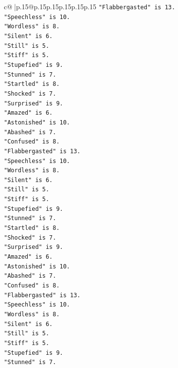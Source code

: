 \documentclass{article}
\begin{document}
{\begin{supertabular}{c@{$\;$}|p{.15\linewidth}@{}p{.15\linewidth}p{.15\linewidth}p{.15\linewidth}p{.15\linewidth}p{.15\linewidth}}
{{{\texttt{"Flabbergasted" is 13.} \\
\texttt{"Speechless" is 10.} \\
\texttt{"Wordless" is 8.} \\
\texttt{"Silent" is 6.} \\
\texttt{"Still" is 5.} \\
\texttt{"Stiff" is 5.} \\
\texttt{"Stupefied" is 9.} \\
\texttt{"Stunned" is 7.} \\
\texttt{"Startled" is 8.} \\
\texttt{"Shocked" is 7.} \\
\texttt{"Surprised" is 9.} \\
\texttt{"Amazed" is 6.} \\
\texttt{"Astonished" is 10.} \\
\texttt{"Abashed" is 7.} \\
\texttt{"Confused" is 8.} \\
\texttt{"Flabbergasted" is 13.} \\
\texttt{"Speechless" is 10.} \\
\texttt{"Wordless" is 8.} \\
\texttt{"Silent" is 6.} \\
\texttt{"Still" is 5.} \\
\texttt{"Stiff" is 5.} \\
\texttt{"Stupefied" is 9.} \\
\texttt{"Stunned" is 7.} \\
\texttt{"Startled" is 8.} \\
\texttt{"Shocked" is 7.} \\
\texttt{"Surprised" is 9.} \\
\texttt{"Amazed" is 6.} \\
\texttt{"Astonished" is 10.} \\
\texttt{"Abashed" is 7.} \\
\texttt{"Confused" is 8.} \\
\texttt{"Flabbergasted" is 13.} \\
\texttt{"Speechless" is 10.} \\
\texttt{"Wordless" is 8.} \\
\texttt{"Silent" is 6.} \\
\texttt{"Still" is 5.} \\
\texttt{"Stiff" is 5.} \\
\texttt{"Stupefied" is 9.} \\
\texttt{"Stunned" is 7.} \\
}}}
\end{supertabular}}
\end{document}
